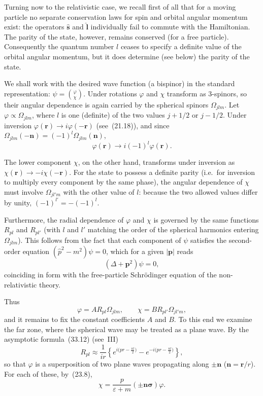Turning now to the relativistic case, we recall first of all that for a moving particle no separate conservation laws for spin and orbital angular momentum exist: the operators $\widehat{\mathbf{s}}$ and $\widehat{\mathbf{l}}$ individually fail to commute with the Hamiltonian. The parity of the state, however, remains conserved (for a free particle). Consequently the quantum number $l$ ceases to specify a definite value of the orbital angular momentum, but it does determine (see below) the parity of the state.

We shall work with the desired wave function (a bispinor) in the standard representation: $\psi = \binom{\varphi}{\chi}$. Under rotations $\varphi$ and $\chi$ transform as 3-spinors, so their angular dependence is again carried by the spherical spinors $\Omega_{jlm}$. Let $\varphi \propto \Omega_{jlm}$, where $l$ is one (definite) of the two values $j + 1/2$ or $j - 1/2$. Under inversion $\varphi(\mathbf{r}) \to i\varphi(-\mathbf{r})$ (see~(21.18)), and since $\Omega_{jlm}(-\mathbf{n}) = (-1)^l\Omega_{jlm}(\mathbf{n})$,
\[
\varphi(\mathbf{r}) \to i(-1)^l\varphi(\mathbf{r}).
\]

The lower component $\chi$, on the other hand, transforms under inversion as $\chi(\mathbf{r}) \to -i\chi(-\mathbf{r})$. For the state to possess a definite parity (i.e.\ for inversion to multiply every component by the same phase), the angular dependence of $\chi$ must involve $\Omega_{jl'm}$ with the other value of $l$: because the two allowed values differ by unity, $(-1)^{l'} = -(-1)^l$.

Furthermore, the radial dependence of $\varphi$ and $\chi$ is governed by the same functions $R_{pl}$ and $R_{pl'}$ (with $l$ and $l'$ matching the order of the spherical harmonics entering $\Omega_{jlm}$). This follows from the fact that each component of $\psi$ satisfies the second-order equation $(\widehat p^2 - m^2)\psi = 0$, which for a given $|\mathbf{p}|$ reads
\[
(\Delta + \mathbf{p}^2)\psi = 0,
\]
coinciding in form with the free-particle Schr\"odinger equation of the non-relativistic theory.

Thus
\begin{equation}
\varphi = AR_{pl}\Omega_{jlm},\qquad \chi = BR_{pl'}\Omega_{jl'm},
\tag{24.6}
\end{equation}
and it remains to fix the constant coefficients $A$ and $B$. To this end we examine the far zone, where the spherical wave may be treated as a plane wave. By the asymptotic formula~(33.12) (see~III)
\begin{equation}
R_{pl} \approx \frac{1}{ir}\left\{e^{i\bigl(pr - \frac{\pi l}{2}\bigr)} - e^{-i\bigl(pr - \frac{\pi l}{2}\bigr)}\right\},
\tag{24.7}
\end{equation}
so that $\varphi$ is a superposition of two plane waves propagating along $\pm\mathbf{n}$ ($\mathbf{n} = \mathbf{r}/r$). For each of these, by~(23.8),
\[
\chi = \frac{p}{\varepsilon + m}(\pm\mathbf{n}\boldsymbol{\sigma})\varphi.
\]

